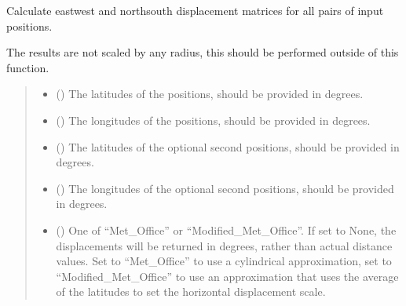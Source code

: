 \documentclass[letterpaper,10pt,english]{sphinxmanual}
\begin{document}
\begin{fulllineitems}
\label{\detokenize{misc:glomar_gridding.distances.displacements}}
\pysigstartsignatures
\pysiglinewithargsret
{}
{\sphinxparamcomma {}\sphinxparamcomma {}\sphinxparamcomma {}\sphinxparamcomma {}}
{}
\pysigstopsignatures
\sphinxAtStartPar
Calculate east\sphinxhyphen{}west and north\sphinxhyphen{}south displacement matrices for all pairs
of input positions.

\sphinxAtStartPar
The results are not scaled by any radius, this should be performed outside
of this function.
\begin{quote}\begin{description}
\begin{itemize}
\item {}
\sphinxAtStartPar
{} () \textendash{} The latitudes of the positions, should be provided in degrees.

\item {}
\sphinxAtStartPar
{} () \textendash{} The longitudes of the positions, should be provided in degrees.

\item {}
\sphinxAtStartPar
{} () \textendash{} The latitudes of the optional second positions, should be provided in
degrees.

\item {}
\sphinxAtStartPar
{} () \textendash{} The longitudes of the optional second positions, should be provided in
degrees.

\item {}
\sphinxAtStartPar
{} (\sphinxstyleliteralemphasis{\sphinxupquote{ | }}) \textendash{} One of “Met\_Office” or “Modified\_Met\_Office”. If set to None, the
displacements will be returned in degrees, rather than actual distance
values. Set to “Met\_Office” to use a cylindrical approximation, set
to “Modified\_Met\_Office” to use an approximation that uses the average
of the latitudes to set the horizontal displacement scale.


\end{itemize}
\end{description}
\end{quote}
\end{fulllineitems}
\end{document}
